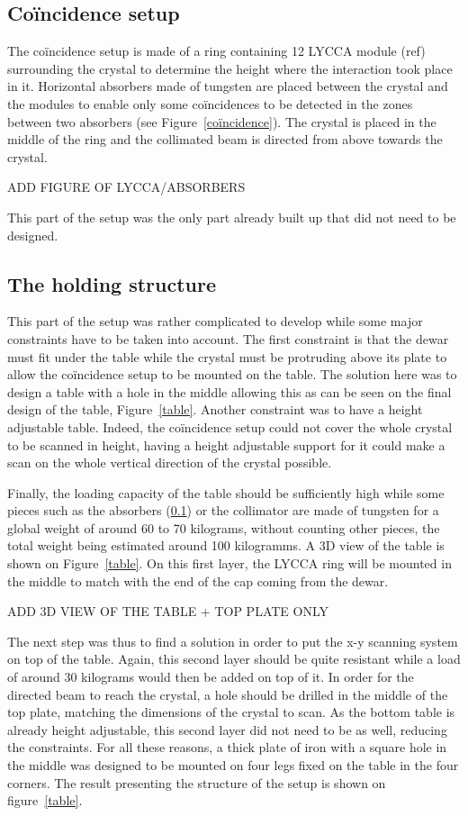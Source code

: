 \documentclass[11pt,a4paper]{article}
\begin{document}
\subsection{Coïncidence setup} \label{coin_setup}

The coïncidence setup is made of a ring containing 12 LYCCA module (ref) surrounding the crystal to determine the height where the interaction took place in it. Horizontal absorbers made of tungsten are placed between the crystal and the modules to enable only some coïncidences to be detected in the zones between two absorbers (see Figure~\ref{coïncidence}). The crystal is placed in the middle of the ring and the collimated beam is directed from above towards the crystal.

ADD FIGURE OF LYCCA/ABSORBERS

This part of the setup was the only part already built up that did not need to be designed.

\subsection{The holding structure}

This part of the setup was rather complicated to develop while some major constraints have to be taken into account. The first constraint is that the dewar must fit under the table while the crystal must be protruding above its plate to allow the coïncidence setup to be mounted on the table. The solution here was to design a table with a hole in the middle allowing this as can be seen on the final design of the table, Figure~\ref{table}. Another constraint was to have a height adjustable table. Indeed, the coïncidence setup could not cover the whole crystal to be scanned in height, having a height adjustable support for it could make a scan on the whole vertical direction of the crystal possible.

Finally, the loading capacity of the table should be sufficiently high while some pieces such as the absorbers (\ref{coin_setup}) or the collimator are made of tungsten for a global weight of around 60 to 70 kilograms, without counting other pieces, the total weight being estimated around 100 kilogramms. A 3D view of the table is shown on Figure~\ref{table}. On this first layer, the LYCCA ring will be mounted in the middle to match with the end of the cap coming from the dewar.

ADD 3D VIEW OF THE TABLE + TOP PLATE ONLY

The next step was thus to find a solution in order to put the x-y scanning system on top of the table. Again, this second layer should be quite resistant while a load of around 30 kilograms would then be added on top of it. In order for the directed beam to reach the crystal, a hole should be drilled in the middle of the top plate, matching the dimensions of the crystal to scan. As the bottom table is already height adjustable, this second layer did not need to be as well, reducing the constraints. For all these reasons, a thick plate of iron with a square hole in the middle was designed to be mounted on four legs fixed on the table in the four corners. The result presenting the structure of the setup is shown on figure~\ref{table}.
\end{document}
